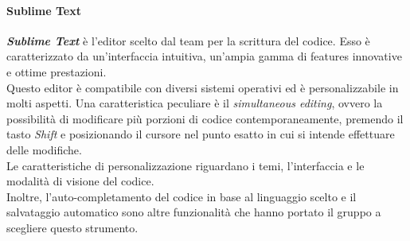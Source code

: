 		\paragraph{Sublime Text}
		\textbf{\textit{Sublime Text}} è l'editor scelto dal team per la scrittura del codice. Esso è caratterizzato da un'interfaccia intuitiva, un'ampia gamma di features innovative e ottime prestazioni.\\
		Questo editor è compatibile con diversi sistemi operativi ed è personalizzabile in molti aspetti. Una caratteristica peculiare è il \textit{simultaneous editing}, ovvero la possibilità di modificare più porzioni di codice contemporaneamente, premendo il tasto \textit{Shift} e posizionando il cursore nel punto esatto in cui si intende effettuare delle modifiche.\\
		Le caratteristiche di personalizzazione riguardano i temi, l'interfaccia e le modalità di visione del codice.\\
		Inoltre, l'auto-completamento del codice in base al linguaggio scelto e il salvataggio automatico sono altre funzionalità che hanno portato il gruppo a scegliere questo strumento.
